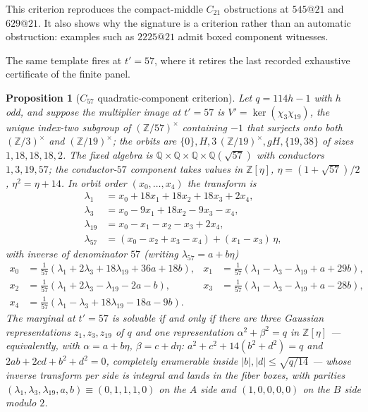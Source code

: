 \documentclass[11pt]{article}
\theoremstyle{plain}
\newtheorem{proposition}[theorem]{Proposition}
\theoremstyle{definition}
\theoremstyle{remark}
\newcommand{\Z}{\mathbb Z}
\newcommand{\Q}{\mathbb Q}
\begin{document}
This criterion reproduces the compact-middle $C_{21}$ obstructions at
$545@21$ and $629@21$. It also shows why the signature is a criterion rather
than an automatic obstruction: examples such as $2225@21$ admit boxed
component witnesses.

The same template fires at $t'=57$, where it retires the last recorded
exhaustive certificate of the finite panel.

\begin{proposition}[$C_{57}$ quadratic-component criterion]\label{prop:c57-sqrt57}
Let $q=114h-1$ with $h$ odd, and suppose the multiplier image at
$t'=57$ is $V'=\ker(\chi_3\chi_{19})$, the unique index-two subgroup of
$(\Z/57)^\times$ containing $-1$ that surjects onto both
$(\Z/3)^\times$ and $(\Z/19)^\times$; the orbits are
$\{0\},H,3\,(\Z/19)^\times,gH,\{19,38\}$ of sizes $1,18,18,18,2$.  The
fixed algebra is $\Q\times\Q\times\Q\times\Q(\sqrt{57})$ with
conductors $1,3,19,57$; the conductor-$57$ component takes values in
$\Z[\eta]$, $\eta=(1+\sqrt{57})/2$, $\eta^2=\eta+14$.  In orbit order
$(x_0,\dots,x_4)$ the transform is
\[
\begin{aligned}
  \lambda_1&=x_0+18x_1+18x_2+18x_3+2x_4,\\
  \lambda_3&=x_0-9x_1+18x_2-9x_3-x_4,\\
  \lambda_{19}&=x_0-x_1-x_2-x_3+2x_4,\\
  \lambda_{57}&=(x_0-x_2+x_3-x_4)+(x_1-x_3)\,\eta,
\end{aligned}
\]
with inverse of denominator $57$ (writing $\lambda_{57}=a+b\eta$)
\[
\begin{aligned}
  x_0&=\tfrac1{57}(\lambda_1+2\lambda_3+18\lambda_{19}+36a+18b),&
  x_1&=\tfrac1{57}(\lambda_1-\lambda_3-\lambda_{19}+a+29b),\\
  x_2&=\tfrac1{57}(\lambda_1+2\lambda_3-\lambda_{19}-2a-b),&
  x_3&=\tfrac1{57}(\lambda_1-\lambda_3-\lambda_{19}+a-28b),\\
  x_4&=\tfrac1{57}(\lambda_1-\lambda_3+18\lambda_{19}-18a-9b).&&
\end{aligned}
\]
The marginal at $t'=57$ is solvable if and only if there are three
Gaussian representations $z_1,z_3,z_{19}$ of $q$ and one representation
$\alpha^2+\beta^2=q$ in $\Z[\eta]$ --- equivalently, with
$\alpha=a+b\eta$, $\beta=c+d\eta$: $a^2+c^2+14(b^2+d^2)=q$ and
$2ab+2cd+b^2+d^2=0$, completely enumerable inside
$|b|,|d|\le\sqrt{q/14}$ --- whose inverse transform per side is
integral and lands in the fiber boxes, with parities
$(\lambda_1,\lambda_3,\lambda_{19},a,b)\equiv(0,1,1,1,0)$ on the $A$
side and $(1,0,0,0,0)$ on the $B$ side modulo $2$.
\end{proposition}
\end{document}
